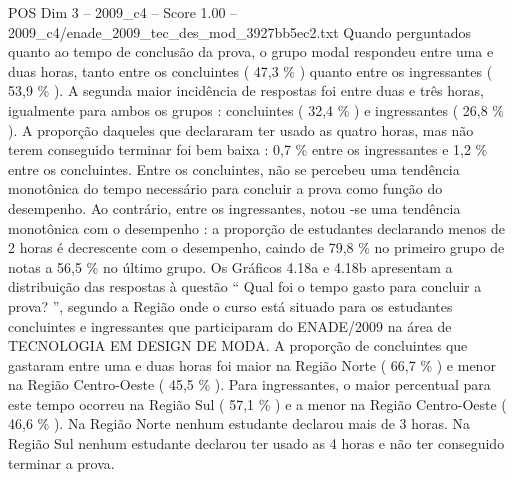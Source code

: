 \begin{textsample}{POS Dim 3 – 2009\_c4 – Score 1.00 – 2009\_c4/enade\_2009\_tec\_des\_mod\_3927bb5ec2.txt}
Quando perguntados quanto ao tempo de conclusão da prova, o grupo modal respondeu entre uma e duas horas, tanto entre os concluintes ( 47,3 \% ) quanto entre os ingressantes ( 53,9 \% ).
A segunda maior incidência de respostas foi entre duas e três horas, igualmente para ambos os grupos : concluintes ( 32,4 \% ) e ingressantes ( 26,8 \% ).
A proporção daqueles que declararam ter usado as quatro horas, mas não terem conseguido terminar foi bem baixa : 0,7 \% entre os ingressantes e 1,2 \% entre os concluintes.
Entre os concluintes, não se percebeu uma tendência monotônica do tempo necessário para concluir a prova como função do desempenho.
Ao contrário, entre os ingressantes, notou -se uma tendência monotônica com o desempenho : a proporção de estudantes declarando menos de 2 horas é decrescente com o desempenho, caindo de 79,8 \% no primeiro grupo de notas a 56,5 \% no último grupo.
Os Gráficos 4.18a e 4.18b apresentam a distribuição das respostas à questão “ Qual foi o tempo gasto para concluir a prova? ”, segundo a Região onde o curso está situado para os estudantes concluintes e ingressantes que participaram do ENADE/2009 na área de TECNOLOGIA EM DESIGN DE MODA.
A proporção de concluintes que gastaram entre uma e duas horas foi maior na Região Norte ( 66,7 \% ) e menor na Região Centro-Oeste ( 45,5 \% ).
Para ingressantes, o maior percentual para este tempo ocorreu na Região Sul ( 57,1 \% ) e a menor na Região Centro-Oeste ( 46,6 \% ).
Na Região Norte nenhum estudante declarou mais de 3 horas.
Na Região Sul nenhum estudante declarou ter usado as 4 horas e não ter conseguido terminar a prova.

\end{textsample}
